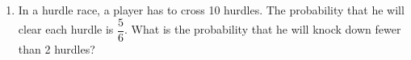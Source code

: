 \begin{enumerate}[label=\thechapter.\arabic*,ref=\thechapter.\theenumi]
\item In a hurdle race, a player has to cross 10 hurdles. The probability that he will clear each hurdle is $\dfrac{5}{6}$. What is the probability that he will knock down fewer than 2 hurdles?
\end{enumerate}
